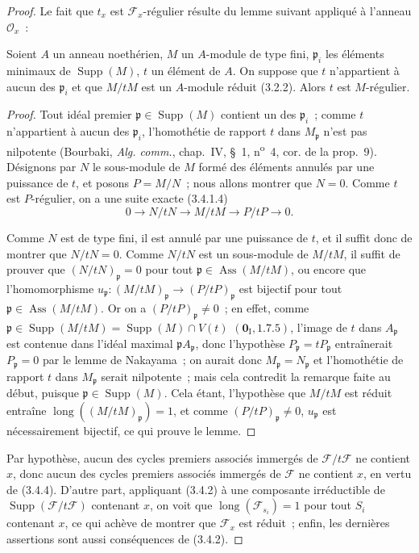 \begin{proof}
Le fait que $t_x$ est $\mathcal F_x$-régulier résulte du lemme suivant appliqué
à l'anneau $\mathcal O_x$~:

\begin{lemma}[3.4.6.1]
\label{IV.2.3.4.6.1-fr}
Soient $A$ un anneau noethérien, $M$ un $A$-module de type fini,
$\mathfrak p_i$ les éléments minimaux de $\operatorname{Supp}(M)$, $t$ un
élément de $A$. On suppose que $t$ n'appartient à aucun des $\mathfrak p_i$
et que $M/tM$ est un $A$-module réduit \textup{(3.2.2)}. Alors $t$ est $M$-régulier.
\end{lemma}

\begin{proof}
Tout idéal premier $\mathfrak p\in\operatorname{Supp}(M)$ contient un des
$\mathfrak p_i$~; comme $t$ n'appartient à aucun des $\mathfrak p_i$,
l'homothétie de rapport $t$ dans $M_{\mathfrak p}$ n'est pas nilpotente
(Bourbaki, \emph{Alg. comm.}, chap.~IV, \S~1, n\textsuperscript{o}~4, cor. de
la prop.~9). Désignons par $N$ le sous-module de $M$ formé des éléments
annulés par une puissance de $t$, et posons $P=M/N$~; nous allons montrer que
$N=0$. Comme $t$ est $P$-régulier, on a une suite exacte (3.4.1.4)
\[
0\longrightarrow N/tN\longrightarrow M/tM\longrightarrow P/tP
\longrightarrow0.
\]

Comme $N$ est de type fini, il est annulé par une puissance de $t$, et il
suffit donc de montrer que $N/tN=0$. Comme $N/tN$ est un sous-module de
$M/tM$, il suffit de prouver que $(N/tN)_{\mathfrak p}=0$ pour tout
$\mathfrak p\in\operatorname{Ass}(M/tM)$, ou encore que l'homomorphisme
$u_{\mathfrak p}:(M/tM)_{\mathfrak p}\longrightarrow(P/tP)_{\mathfrak p}$
est bijectif pour tout $\mathfrak p\in\operatorname{Ass}(M/tM)$. Or on a
$(P/tP)_{\mathfrak p}\neq0$~; en effet, comme
$\mathfrak p\in\operatorname{Supp}(M/tM)
=\operatorname{Supp}(M)\cap V(t)$ $(\mathbf{0}_{\mathrm I},1.7.5)$, l'image de $t$ dans
$A_{\mathfrak p}$ est contenue dans l'idéal maximal
$\mathfrak pA_{\mathfrak p}$, donc l'hypothèse
$P_{\mathfrak p}=tP_{\mathfrak p}$ entraînerait $P_{\mathfrak p}=0$ par le
lemme de Nakayama~; on aurait donc $M_{\mathfrak p}=N_{\mathfrak p}$ et
l'homothétie de rapport $t$ dans $M_{\mathfrak p}$ serait nilpotente~; mais
cela contredit la remarque faite au début, puisque
$\mathfrak p\in\operatorname{Supp}(M)$. Cela étant, l'hypothèse que $M/tM$ est
réduit entraîne $\operatorname{long}((M/tM)_{\mathfrak p})=1$, et comme
$(P/tP)_{\mathfrak p}\neq0$, $u_{\mathfrak p}$ est nécessairement bijectif,
ce qui prouve le lemme.
\end{proof}

Par hypothèse, aucun des cycles premiers associés immergés de
$\mathcal F/t\mathcal F$ ne contient $x$, donc aucun des cycles premiers
associés immergés de $\mathcal F$ ne contient $x$, en vertu de (3.4.4).
D'autre part, appliquant (3.4.2) à une composante irréductible de
$\operatorname{Supp}(\mathcal F/t\mathcal F)$ contenant $x$, on voit que
$\operatorname{long}(\mathcal F_{s_i})=1$ pour tout $S_i$ contenant $x$, ce
qui achève de montrer que $\mathcal F_x$ est réduit~; enfin, les dernières
assertions sont aussi conséquences de (3.4.2).
\end{proof}

